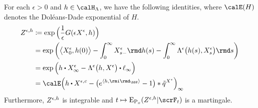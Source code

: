 \begin{proposition}
  \label{proposition:martingale-measure}
  For each $\epsilon > 0$ and $\twistFunc \in \twistSpace$, we have the following identities, where $\calE(H)$ denotes the Dol\'eans-Dade exponential of $H$.
  \begin{align*}
    \mgDensity^{\epsilon,\twistFunc}
    &\defeq \exp\Big(\frac1\epsilon\mgRf(\Xe,\twistFunc) \Big) \\
    &= \exp\bigg( \bprj{\Xee_0}{\twistFunc(0)} - \int_0^\infty \Xee_{s-} \rmd\twistFunc(s) - \int_0^\infty \ode^\epsilon\big(\twistFunc(s), \Xee_s\big) \rmd s \bigg) \\
    &= \exp\Big( \twistFunc \shortInt \Xee_\infty - \ode^\epsilon\big(\twistFunc, \Xee\big) \shortInt \leb_\infty \Big) \\
    &= \calE\Big( \twistFunc \shortInt \X^{\epsilon,c} - \big( e^\prj{\twistFunc}{\id_\vecSpace} - 1 \big) \ast \compensate{\jumpMeas^{\Xee}} \Big)_\infty
  \end{align*}
  Furthermore, $Z^{\epsilon,h}$ is integrable and $t \mapsto \Exp_{\Prb_\stateVar}(\mgDensity^{\epsilon,\twistFunc}| \scrF_t)$ is a martingale.
\end{proposition}
